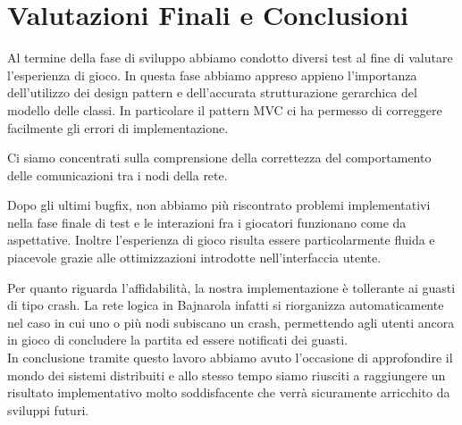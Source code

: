 \section{Valutazioni Finali e Conclusioni}
Al termine della fase di sviluppo abbiamo condotto diversi test al fine
di valutare l'esperienza di gioco.
In questa fase abbiamo appreso appieno l'importanza dell'utilizzo dei
design pattern e dell'accurata strutturazione gerarchica del modello delle
classi. In particolare il pattern MVC ci ha permesso di correggere
facilmente gli errori di implementazione.

Ci siamo concentrati sulla comprensione della correttezza del comportamento delle comunicazioni
tra i nodi della rete.

Dopo gli ultimi bugfix, non abbiamo più riscontrato problemi implementativi
nella fase finale di test e le interazioni fra i giocatori funzionano
come da aspettative. Inoltre l'esperienza di gioco risulta essere
particolarmente fluida e piacevole grazie alle ottimizzazioni introdotte
nell'interfaccia utente.

Per quanto riguarda l'affidabilità, la nostra implementazione è
tollerante ai guasti di tipo crash. La rete logica in Bajnarola infatti si
riorganizza automaticamente nel caso in cui uno o più nodi subiscano un
crash, permettendo agli utenti ancora in gioco di concludere la partita ed essere notificati dei guasti.\\

In conclusione tramite questo lavoro abbiamo avuto l'occasione di
approfondire il mondo dei sistemi distribuiti e allo stesso tempo
siamo riusciti a raggiungere un risultato implementativo molto
soddisfacente che verrà sicuramente arricchito da sviluppi futuri.
